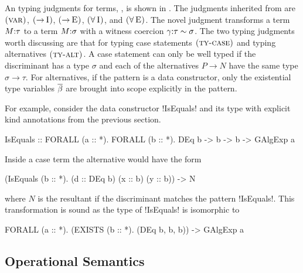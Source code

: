 \documentclass[manuscript,screen,nonacm]{acmart}
\begin{document}
An typing judgments for terms, \fbox{$\Typing \TEnv \Tm \tau$}, is shown in . The judgments inherited from \SF are $\textsc{(var)}$, $\textsc{(\ensuremath{\mathord{\to}}\!~I)}$, $\textsc{(\ensuremath{\mathord{\to}}\!~E)}$, $\textsc{(\ensuremath{\mathord{\forall}}\!~I)}$, and $\textsc{(\ensuremath{\mathord{\forall}}\!~E)}$. The novel judgment  transforms a term $M{:}\tau$ to a term $M{:}\sigma$ with a witness coercion $\gamma{:}\tau\sim\sigma$. The two typing judgments worth discussing are that for typing case statements $\textsc{(ty-case)}$ and typing alternatives $\textsc{(ty-alt)}$. A case statement can only be well typed if the discriminant has a type $\sigma$ and each of the alternatives $P \to N$ have the same type $\sigma \to \tau$. For alternatives, if the pattern is a data constructor, only the existential type variables $\overline{\beta}$ are brought into scope explicitly in the pattern.

For example, consider the data constructor !IsEquals! and its type with explicit kind annotations from the previous section.
\begin{CenteredBox}
\begin{code}
IsEquals :: FORALL (a :: *). FORALL (b :: *). DEq b -> b -> b -> GAlgExp a
\end{code}
\end{CenteredBox}

Inside a case term the alternative would have the form

\begin{CenteredBox}
\begin{code}
(IsEquals (b :: *). (d :: DEq b) (x :: b) (y :: b)) -> N
\end{code}
\end{CenteredBox}

where $N$ is the resultant if the discriminant matches the pattern !IsEquals!.
This transformation is sound as the type of !IsEquals! is isomorphic to

\begin{CenteredBox}
\begin{code}
FORALL (a :: *). (EXISTS (b :: *). (DEq b, b, b)) -> GAlgExp a
\end{code}
\end{CenteredBox}

\subsection{Operational Semantics}
\newcommand{\Beta}{
 \ib{\irule[\trule{$\beta$}]
 {};
 {$\stepsto {(\Lam {x\co\tau} M) \App N} {\Set{x\mapsto N}M}$}
 }
}
\newcommand{\TBeta}{
 \ib{\irule[\trule{Ty-$\beta$}]
 {};
 {$\stepsto {(\TLam \TyVar M) \App \tau} {\Set{\TyVar\mapsto \tau}M}$}
 }
}
\newcommand{\CaseE}{
 \ib{\irule[\trule{case}]
 {};
 {\stepsto {\Case {(K \many\sigma\many\phi\many\Tm)} {\Set{...; K\App\many\beta\App\many x \to N; ...}}} {\Set{\many {\beta\mapsto\phi}, \many{x\mapsto\Tm}}N}}
 }
}
\newcommand{\CoTransE}{
 \ib{\irule[\trule{Co-Trans}]
 {};
 {$\stepsto {\Cast {(\Cast \Val \Co)} {\nu}} {\Cast \Val {(\trans{\Co} {\nu})}}$}
 }
}
\end{document}
